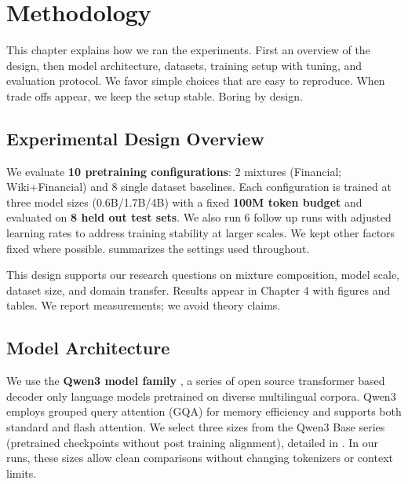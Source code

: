 \chapter{Methodology}

This chapter explains how we ran the experiments. First an overview of the design, then model architecture, datasets, training setup with tuning, and evaluation protocol. We favor simple choices that are easy to reproduce. When trade offs appear, we keep the setup stable. Boring by design.

\section{Experimental Design Overview}

We evaluate \textbf{10 pretraining configurations}: 2 mixtures (Financial; Wiki+Financial) and 8 single dataset baselines. Each configuration is trained at three model sizes (0.6B/1.7B/4B) with a fixed \textbf{100M token budget} and evaluated on \textbf{8 held out test sets}. We also run 6 follow up runs with adjusted learning rates to address training stability at larger scales. We kept other factors fixed where possible.  summarizes the settings used throughout.



This design supports our research questions on mixture composition, model scale, dataset size, and domain transfer. Results appear in Chapter 4 with figures and tables. We report measurements; we avoid theory claims.

\section{Model Architecture}

We use the \textbf{Qwen3 model family} \parencite{yang2024qwen2}, a series of open source transformer based decoder only language models pretrained on diverse multilingual corpora. Qwen3 employs grouped query attention (GQA) for memory efficiency and supports both standard and flash attention. We select three sizes from the Qwen3 Base series (pretrained checkpoints without post training alignment), detailed in . In our runs, these sizes allow clean comparisons without changing tokenizers or context limits.

